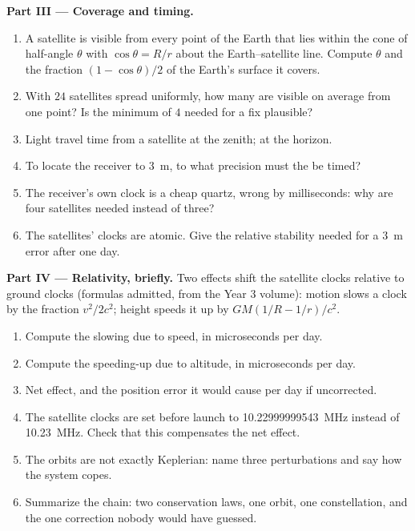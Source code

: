 \begin{problem}
\medskip
\noindent\textbf{Part III --- Coverage and timing.}
\begin{enumerate}[resume]
  \item A satellite is visible from every point of the Earth that lies
        within the cone of half-angle $\theta$ with $\cos\theta = R/r$
        about the Earth--satellite line. Compute $\theta$ and the
        fraction $(1 - \cos\theta)/2$ of the Earth's surface it covers.
  \item With $24$ satellites spread uniformly, how many are visible on
        average from one point? Is the minimum of $4$ needed for a fix
        plausible?
  \item Light travel time from a satellite at the zenith; at the
        horizon.
  \item To locate the receiver to \qty{3}{m}, to what precision must the
         be timed?
  \item The receiver's own clock is a cheap quartz, wrong by
        milliseconds: why are four satellites needed instead of three?
  \item The satellites' clocks are atomic. Give the relative stability
        needed for a \qty{3}{m} error after one day.
\end{enumerate}

\medskip
\noindent\textbf{Part IV --- Relativity, briefly.}
Two effects shift the satellite clocks relative to ground clocks
(formulas admitted, from the Year 3 volume): motion slows a clock by the
fraction $v^2/2c^2$; height speeds it up by $GM(1/R - 1/r)/c^2$.
\begin{enumerate}[resume]
  \item Compute the slowing due to speed, in microseconds per day.
  \item Compute the speeding-up due to altitude, in microseconds per
        day.
  \item Net effect, and the position error it would cause per day if
        uncorrected.
  \item The satellite clocks are set before launch to
        \qty{10.22999999543}{MHz} instead of \qty{10.23}{MHz}. Check that
        this compensates the net effect.
  \item The orbits are not exactly Keplerian: name three perturbations
        and say how the system copes.
  \item Summarize the chain: two conservation laws, one orbit, one
        constellation, and the one correction nobody would have guessed.
\end{enumerate}
\end{problem}
